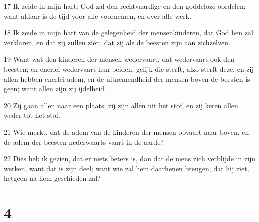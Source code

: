 \par 17 Ik zeide in mijn hart: God zal den rechtvaardige en den goddeloze oordelen; want aldaar is de tijd voor alle voornemen, en over alle werk.
\par 18 Ik zeide in mijn hart van de gelegenheid der mensenkinderen, dat God hen zal verklaren, en dat zij zullen zien, dat zij als de beesten zijn aan zichzelven.
\par 19 Want wat den kinderen der mensen wedervaart, dat wedervaart ook den beesten; en enerlei wedervaart hun beiden; gelijk die sterft, alzo sterft deze, en zij allen hebben enerlei adem, en de uitnemendheid der mensen boven de beesten is geen; want allen zijn zij ijdelheid.
\par 20 Zij gaan allen naar een plaats; zij zijn allen uit het stof, en zij keren allen weder tot het stof.
\par 21 Wie merkt, dat de adem van de kinderen der mensen opvaart naar boven, en de adem der beesten nederwaarts vaart in de aarde?
\par 22 Dies heb ik gezien, dat er niets beters is, dan dat de mens zich verblijde in zijn werken, want dat is zijn deel; want wie zal hem daarhenen brengen, dat hij ziet, hetgeen na hem geschieden zal?

\chapter{4}

